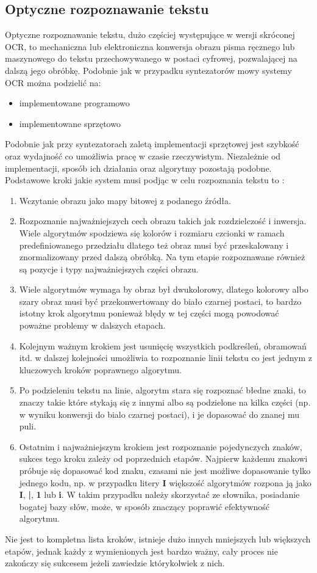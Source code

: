 \subsection{Optyczne rozpoznawanie tekstu}
Optyczne rozpoznawanie tekstu, dużo częściej występujące w wersji skróconej OCR, to mechaniczna lub elektroniczna konwersja obrazu pisma ręcznego lub maszynowego do tekstu przechowywanego w postaci cyfrowej, pozwalającej na dalszą jego obróbkę. Podobnie jak w przypadku syntezatorów mowy systemy OCR można podzielić na:
\begin{itemize}
	\item implementowane programowo
	\item implementowane sprzętowo
\end{itemize}
Podobnie jak przy syntezatorach zaletą implementacji sprzętowej jest szybkość oraz wydajność co umożliwia pracę w czasie rzeczywistym. Niezależnie od implementacji, sposób ich działania oraz algorytmy pozostają podobne. Podstawowe kroki jakie system musi podjąc w celu rozpoznania tekstu to \cite{noor2005} :
\begin{enumerate}
	\item Wczytanie obrazu jako mapy bitowej z podanego źródła.
	\item Rozpoznanie najważniejszych cech obrazu takich jak rozdzielczość i inwersja. Wiele algorytmów spodziewa się kolorów i rozmiaru czcionki w ramach predefiniowanego przedziału dlatego też obraz musi być przeskalowany i znormalizowany przed dalszą obróbką. Na tym etapie rozpoznawane również są pozycje i typy najważniejszych części obrazu.
	\item Wiele algorytmów wymaga by obraz był dwukolorowy, dlatego kolorowy albo szary obraz musi być przekonwertowany do biało czarnej postaci, to bardzo istotny krok algorytmu ponieważ błędy w tej części mogą powodować poważne problemy w dalszych etapach.
	\item Kolejnym ważnym krokiem jest usunięcię wszystkich podkreśleń, obramowań itd. w dalszej kolejności umożliwia to rozpoznanie linii tekstu co jest jednym z kluczowych kroków poprawnego algorytmu.
	\item Po podzieleniu tekstu na linie, algorytm stara się rozpoznać błedne znaki, to znaczy takie które stykają się z innymi albo są podzielone na kilka części (np. w wyniku konwersji do bialo czarnej postaci), i je dopasować do znanej mu puli.
	\item Ostatnim i najważniejszym krokiem jest rozpoznanie pojedynczych znaków, sukces tego kroku zależy od poprzednich etapów. Najpierw każdemu znakowi próbuje się dopasować kod znaku, czasami nie jest możliwe dopasowanie tylko jednego kodu, np. w przypadku litery \textbf{I} większość algorytmów rozpona ją jako \textbf{I}, \textbf{|}, \textbf{1} lub \textbf{i}. W takim przypadku należy skorzystać ze słownika, posiadanie bogatej bazy słów, może, w sposób znaczący poprawić efektywność algorytmu.
\end{enumerate}
Nie jest to kompletna lista kroków, istnieje dużo innych mniejszych lub większych etapów, jednak każdy z wymienionych jest bardzo ważny, cały proces nie zakończy się sukcesem jeżeli zawiedzie którykolwiek z nich. 
